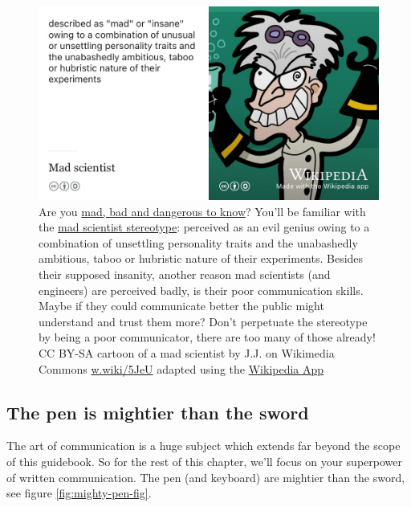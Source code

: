 \documentclass[
]{book}
\begin{document}
\begin{figure}

{\centering \includegraphics[width=1\linewidth]{images/mad-scientist} 

}

\caption{Are you \href{https://en.wikipedia.org/wiki/Mad,_Bad_and_Dangerous_to_Know}{mad, bad and dangerous to know}? You'll be familiar with the \href{https://en.wikipedia.org/wiki/Mad_scientist}{mad scientist stereotype}: perceived as an evil genius owing to a combination of unsettling personality traits and the unabashedly ambitious, taboo or hubristic nature of their experiments. Besides their supposed insanity, another reason mad scientists (and engineers) are perceived badly, is their poor communication skills. Maybe if they could communicate better the public might understand and trust them more? Don't perpetuate the stereotype by being a poor communicator, there are too many of those already! CC BY-SA cartoon of a mad scientist by J.J. on Wikimedia Commons \href{https://w.wiki/5JeU}{w.wiki/5JeU} adapted using the \href{https://apps.apple.com/gb/app/wikipedia/id324715238}{Wikipedia App}}\label{fig:madscientist-fig}
\end{figure}



\hypertarget{mightier}{%
\subsection{The pen is mightier than the sword}\label{mightier}}

The art of communication is a huge subject which extends far beyond the scope of this guidebook. So for the rest of this chapter, we'll focus on your superpower of written communication. The pen (and keyboard) are mightier than the sword, see figure \ref{fig:mighty-pen-fig}.
\end{document}
